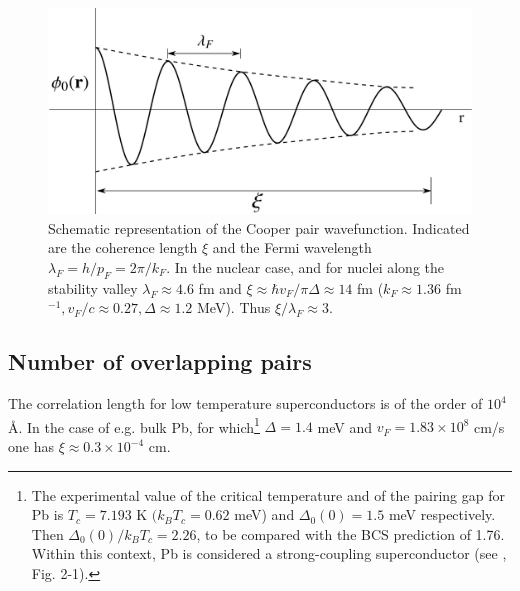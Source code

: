      
        

 \begin{figure}[h]
 	\centerline{\includegraphics*[width=12cm,angle=0	]{nutshell/figs/fig3B2}}
 	\caption{Schematic representation of the Cooper pair wavefunction. Indicated are the coherence length $\xi$ and the Fermi wavelength $\lambda_F=h/p_F=2\pi/k_F$. In the nuclear case, and for nuclei along the stability valley $\lambda_F\approx4.6$ fm and $\xi\approx \hbar v_F/\pi\Delta\approx14$ fm ($k_F\approx 1.36$ fm $^{-1}, v_F/c\approx0.27, \Delta\approx 1.2$ MeV). Thus $\xi/\lambda_F\approx 3$.}\label{fig3B2}
 \end{figure}
 





\subsection{Number of overlapping pairs}
 

The correlation length for low temperature superconductors is of the order of $10^4$\AA. In the case of e.g. bulk Pb, for which\footnote{\label{foot75}  The experimental value of the critical temperature and of the pairing gap for Pb is $T_c=7.193$ K $(k_BT_c=0.62$ meV) and $\Delta_0(0)=1.5$ meV respectively.  Then  $\Delta_0(0)/k_BT_c=2.26$, to be compared with the BCS prediction of 1.76. Within this context, Pb is considered a strong-coupling superconductor (see \cite{Tinkham:96}, Fig. 2-1).} $\Delta=1.4$ meV and $v_F=1.83\times10^8$ cm/s one has $\xi\approx0.3\times10^{-4}$ cm. 

